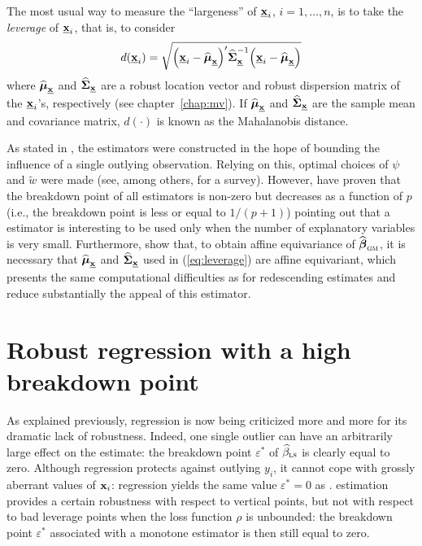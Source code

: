 The most usual way to measure the “largeness” of $\underline{\mathbf x}_{i}$,
$i=1, \dots, n$, is to take the \emph{leverage} of $\underline{\mathbf x}_{i}$,
that is, to consider
%
\begin{equation}
    \label{eq:leverage}
    d(\underline{\stvec{x}}_{i}) = 
    \sqrt{\left(\underline{\stvec{x}}_{i} - \sthat{\boldsymbol\mu}_{\underline{\stvec{x}}}\right)'
    \sthat{\boldsymbol\Sigma}_{\underline{\stvec{x}}}^{-1}
    \left(\underline{\stvec{x}}_{i} - \sthat{\boldsymbol\mu}_{\underline{\stvec{x}}}\right)}
\end{equation}
%
where $\widehat{\boldsymbol\mu}_{\underline{\mathbf x}}$ and
$\widehat{\boldsymbol\Sigma}_{\underline{\mathbf x}}$ are a robust location
vector and robust dispersion matrix of the $\underline{\mathbf x}_{i}$'s,
respectively (see chapter~\ref{chap:mv}). If
$\widehat{\boldsymbol\mu}_{\underline{\mathbf x}}$ and
$\widehat{\boldsymbol\Sigma}_{\underline{\mathbf x}}$ are the sample mean and
covariance matrix, $d(\cdot)$ is known as the Mahalanobis distance.

As stated in \citet{rousseeuw:leroy:1987}, the  estimators were
constructed in the hope of bounding the influence of a single outlying
observation. Relying on this, optimal choices of $\psi$ and $\widetilde{w}$
were made (see, among others, \citealp{Ronchetti:Rousseeuw:1985} for a survey).
However, \citet{Maronna:1979} have proven that the breakdown point of all
 estimators is non-zero but decreases as a function of $p$ (i.e., the
breakdown point is less or equal to $1/(p+1)$) pointing out that a
 estimator is interesting to be used only when the number of
explanatory variables is very small. Furthermore, \citet{maronna:etal:2006}
show that, to obtain affine equivariance of
$\sthat{\boldsymbol\beta}_{\stsc{GM}}$, it is necessary that
$\widehat{\boldsymbol\mu}_{\underline{\mathbf x}}$ and
$\widehat{\boldsymbol\Sigma}_{\underline{\mathbf x}}$ used in (\ref{eq:leverage})
are affine equivariant, which presents the same computational difficulties as
for redescending  estimates and reduce substantially the appeal of this
estimator.

\section{Robust regression with a high breakdown point}

As explained previously,  regression is now being criticized more and
more for its dramatic lack of robustness. Indeed, one single outlier can have
an arbitrarily large effect on the estimate: the breakdown point
$\varepsilon^*$ of $\sthat{\beta}_{\stsc{LS}}$ is clearly equal to zero.
Although  regression protects against outlying $y_{i}$, it cannot
cope with grossly aberrant values of $\mathbf x_{i}$:  regression
yields the same value $\varepsilon^*=0$ as .  estimation
provides a certain robustness with respect to vertical points, but not with
respect to bad leverage points when the loss function $\rho$ is unbounded: the
breakdown point $\varepsilon^*$ associated with a monotone  estimator
is then still equal to zero.


